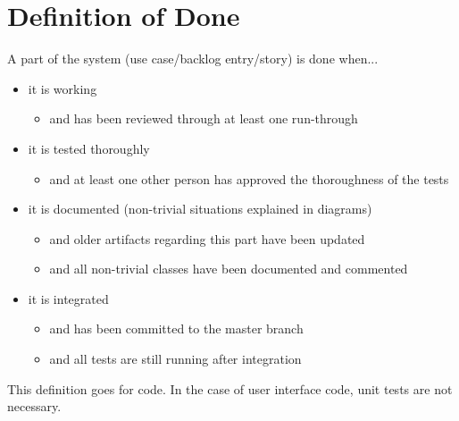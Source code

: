 \section{Definition of Done}
\label{sec:definition-of-done}

A part of the system (use case/backlog entry/story) is done when...
\begin{itemize}
    \item it is working
    \begin{itemize}
        \item and has been reviewed through at least one run-through
    \end{itemize}
    \item it is tested thoroughly
    \begin{itemize}
        \item and at least one other person has approved the thoroughness of the tests
    \end{itemize}
    \item it is documented (non-trivial situations explained in diagrams)
    \begin{itemize}
        \item and older artifacts regarding this part have been updated
        \item and all non-trivial classes have been documented and commented
    \end{itemize}
    \item it is integrated
    \begin{itemize}
        \item and has been committed to the master branch
        \item and all tests are still running after integration
    \end{itemize}
\end{itemize}

This definition goes for code. In the case of user interface code, unit tests are not necessary.